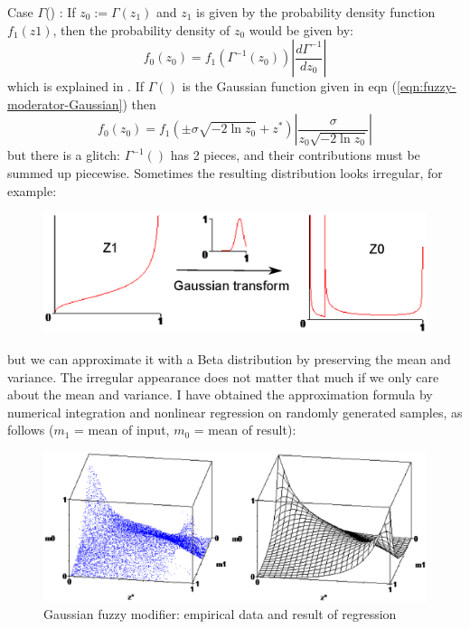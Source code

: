 \documentclass[a4paper]{report}
\begin{document}
Case $\Gamma$() : If $z_0 := \Gamma(z_1)$ and $z_1$ is given by the probability density function $f_1(z1)$, then the probability density of $z_0$ would be given by:
\begin{equation}
f_0(z_0) = f_1(\Gamma^{-1}(z_0)) \left | \frac{d\Gamma^{-1}}{dz_0} \right |
\end{equation}
which is explained in \citep*{Wikipedia2008}.  If $\Gamma()$ is the Gaussian function given in eqn (\ref{eqn:fuzzy-moderator-Gaussian}) then\\
$$ f_0(z_0) = f_1(\pm \sigma \sqrt{-2 \ln z_0} + z^*) \left | \frac{\sigma}{z_0 \sqrt{-2 \ln z_0}} \right | $$
but there is a glitch:  $\Gamma^{-1}()$ has 2 pieces, and their contributions must be summed up piecewise.  Sometimes the resulting distribution looks irregular, for example:
\begin{figure}[H]
\centering
\includegraphics[scale=0.9]{Z1-Gaussian-transform-to-Z0-ugly.ps}
\end{figure}
but we can approximate it with a Beta distribution by preserving the mean and variance.  The irregular appearance does not matter that much if we only care about the mean and variance.  I have obtained the approximation formula by numerical integration and nonlinear regression on randomly generated samples, as follows ($m_1$ = mean of input, $m_0$ = mean of result):
\begin{figure}[H]
\centering
\includegraphics[scale=0.7]{Gaussian-fuzzy-modifier-regression-result.ps}
\caption{Gaussian fuzzy modifier:  empirical data and result of regression}
\end{figure}
\end{document}
